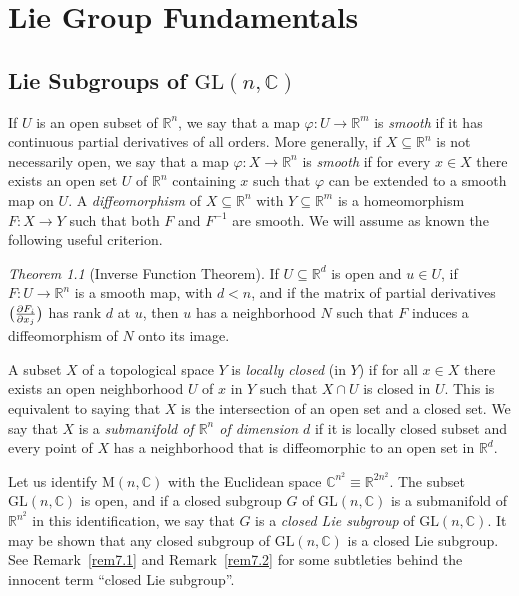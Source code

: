 \documentclass[12pt,reqno]{book}%
\theoremstyle{definition}
\theoremstyle{remark}
\theoremstyle{theorem}
\newtheorem*{utheorem}{Theorem}
\theoremstyle{remark}
\begin{document}
\part{Lie Group Fundamentals}\label{}%
\chapter{Lie Subgroups of $\mathrm{GL}(n, \mathbb{C})$}\label{}%
If $U$ is an open subset of $\mathbb{R}^{n}$, we say that a map $\varphi : U \to \mathbb{R}^{m}$ is \emph{smooth} if it has continuous partial derivatives of all orders.
More generally, if $X \subseteq \mathbb{R}^{n}$ is not necessarily open, we say that a map $\varphi : X \to \mathbb{R}^{n}$ is \emph{smooth} if for every $x \in X$ there exists an open set $U$ of $\mathbb{R}^{n}$ containing $x$ such that $\varphi$ can be extended to a smooth map on $U$.
A \emph{diffeomorphism} of $X \subseteq \mathbb{R}^{n}$ with $Y \subseteq \mathbb{R}^{m}$ is a homeomorphism $F : X \to Y$ such that both $F$ and $F^{-1}$ are smooth.
We will assume as known the following useful criterion.

\begin{utheorem}[Inverse Function Theorem]%
    If $U \subseteq \mathbb{R}^{d}$ is open and $u \in U$, if $F : U \to \mathbb{R}^{n}$ is a smooth map, with $d < n$, and if the matrix of partial derivatives $\big(\pdv{F_i}{x_j}\big)$ has rank $d$ at $u$, then $u$ has a neighborhood $N$ such that $F$ induces a diffeomorphism of $N$ onto its image.
\end{utheorem}%

A subset $X$ of a topological space $Y$ is \emph{locally closed} (in $Y$) if for all $x \in X$ there exists an open neighborhood $U$ of $x$ in $Y$ such that $X \cap U$ is closed in $U$.
This is equivalent to saying that $X$ is the intersection of an open set and a closed set.
We say that $X$ is a \emph{submanifold of $\mathbb{R}^{n}$ of dimension $d$} if it is locally closed subset and every point of $X$ has a neighborhood that is diffeomorphic to an open set in $\mathbb{R}^{d}$.

Let us identify $\mathrm{M}(n, \mathbb{C})$ with the Euclidean space $\mathbb{C}^{n^2} \equiv \mathbb{R}^{2n^2}$.
The subset $\mathrm{GL}(n, \mathbb{C})$ is open, and if a closed subgroup $G$ of $\mathrm{GL}(n, \mathbb{C})$ is a submanifold of $\mathbb{R}^{n^2}$ in this identification, we say that $G$ is a \emph{closed Lie subgroup} of $\mathrm{GL}(n, \mathbb{C})$.
It may be shown that any closed subgroup of $\mathrm{GL}(n, \mathbb{C})$ is a closed Lie subgroup.
See Remark~\ref{rem7.1} and Remark~\ref{rem7.2} for some subtleties behind the innocent term ``closed Lie subgroup''.
\end{document}

